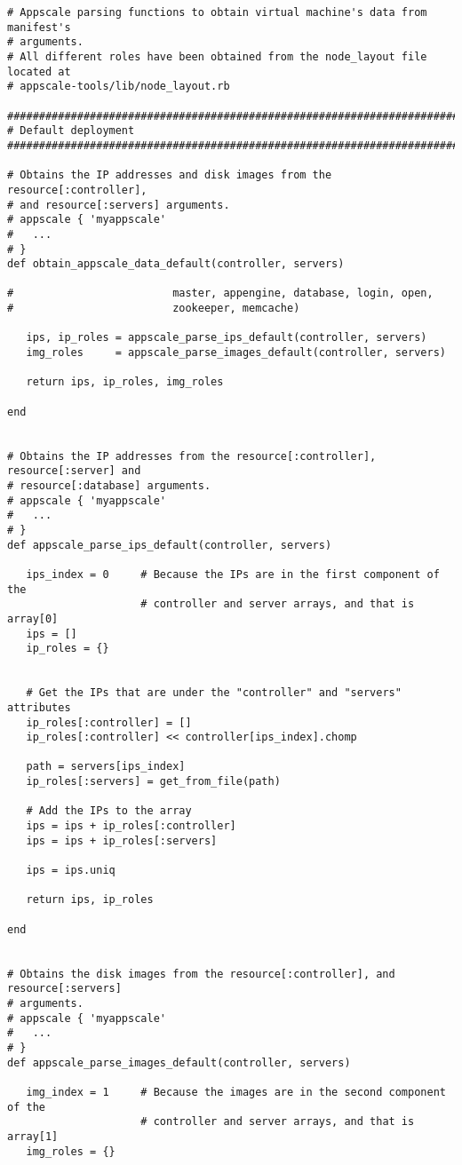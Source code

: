 \begin{lstlisting}
# Appscale parsing functions to obtain virtual machine's data from manifest's
# arguments.
# All different roles have been obtained from the node_layout file located at
# appscale-tools/lib/node_layout.rb

################################################################################
# Default deployment
################################################################################

# Obtains the IP addresses and disk images from the resource[:controller],
# and resource[:servers] arguments.
# appscale { 'myappscale'
#   ...
# }
def obtain_appscale_data_default(controller, servers)

#                         master, appengine, database, login, open,
#                         zookeeper, memcache)

   ips, ip_roles = appscale_parse_ips_default(controller, servers)
   img_roles     = appscale_parse_images_default(controller, servers)
   
   return ips, ip_roles, img_roles

end


# Obtains the IP addresses from the resource[:controller], resource[:server] and
# resource[:database] arguments.
# appscale { 'myappscale'
#   ...
# }
def appscale_parse_ips_default(controller, servers)

   ips_index = 0     # Because the IPs are in the first component of the
                     # controller and server arrays, and that is array[0]
   ips = []
   ip_roles = {}

   
   # Get the IPs that are under the "controller" and "servers" attributes
   ip_roles[:controller] = []
   ip_roles[:controller] << controller[ips_index].chomp
   
   path = servers[ips_index]
   ip_roles[:servers] = get_from_file(path)
   
   # Add the IPs to the array
   ips = ips + ip_roles[:controller]
   ips = ips + ip_roles[:servers]
   
   ips = ips.uniq
   
   return ips, ip_roles
   
end


# Obtains the disk images from the resource[:controller], and resource[:servers]
# arguments.
# appscale { 'myappscale'
#   ...
# }
def appscale_parse_images_default(controller, servers)

   img_index = 1     # Because the images are in the second component of the
                     # controller and server arrays, and that is array[1]
   img_roles = {}


\end{lstlisting}
